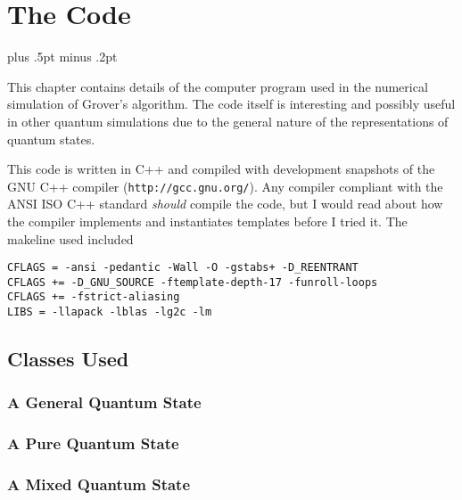 

\chapter{The Code}
\label{chap:code}

\baselineskip=15.5pt plus .5pt minus .2pt

This chapter contains details of the computer program used
in the numerical simulation of Grover's algorithm.
The code itself is interesting and possibly useful in
other quantum simulations due to the general nature of the
representations of quantum states.

This code is written in C++ and compiled with development
snapshots of the GNU C++ compiler (\texttt{http://gcc.gnu.org/}).
Any compiler compliant with the ANSI ISO C++ standard \emph{should}
compile the code, but I would read about how the compiler implements
and instantiates templates before I tried it.  The makeline
used included
\begin{verbatim}
CFLAGS = -ansi -pedantic -Wall -O -gstabs+ -D_REENTRANT 
CFLAGS += -D_GNU_SOURCE -ftemplate-depth-17 -funroll-loops 
CFLAGS += -fstrict-aliasing
LIBS = -llapack -lblas -lg2c -lm
\end{verbatim}



\section{Classes Used}

\subsection{A General Quantum State}
\subsection{A Pure Quantum State}
\subsection{A Mixed Quantum State}
\label{ssec:mixedstate}


